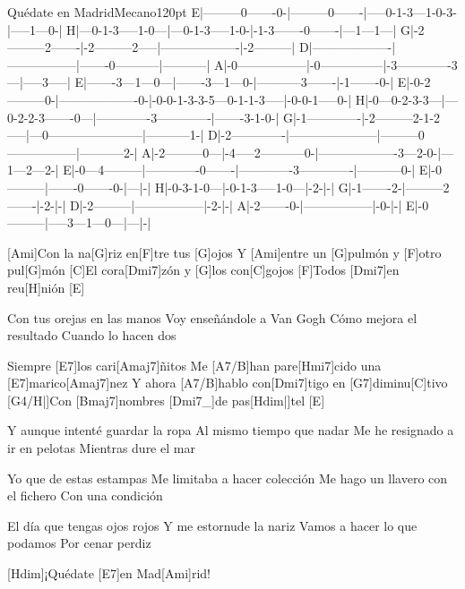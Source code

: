 \begin{song}{Quédate en Madrid}{Mecano}{120pt}
\tabs{20pt}
E|---------0-------0-|---------0-------|-----0-1-3---1-0-3-|-----1---0-|
H|---0-1-3-----1-0---|---0-1-3-----1-0-|-1-3-------0-------|---1---1---|
G|-2---------2-------|-2---------2-----|-------------------|-2---------|
D|-------------------|-----------------|-------0-----------|-----------|
A|-0-----------------|-0---------------|-3-------------3---|-----3-----|
E|-------3---1---0---|-------3---1---0-|-----------3-------|-1-------0-|
\endtabs
\tabs{-15pt}
E|-0-2---------0-|-------------------0-|-0-0-1-3-3-5---0-1-1-3-----|-0-0-1-----0-|
H|-0---0-2-3-3---|---0-2-2-3-------0---|-------------3-------------|-------3-1-0-|
G|-1-------------|-2---------2-1-2-----|---0-----------------------|-----------1-|
D|-2-------------|---------------------|---------0-----------------|-----------2-|
A|-2---------0---|-4-----2-----------0-|-------------------3---2-0-|---1---2---2-|
E|-0---4---------|-------------0-------|-------------3-------------|-----------0-|
\endtabs
\tabs{120pt}
E|-0---------|-------0-------0-|---|-|
H|-0-3-1-0---|-0-1-3-----1-0---|-2-|-|
G|-1-------2-|---------2-------|-2-|-|
D|-2---------|-----------------|-2-|-|
A|-2-------0-|-----------------|-0-|-|
E|-0---------|-----3---1---0---|---|-|
\endtabs

%
[Ami]Con la na[G]riz en[F]tre tus [G]ojos
Y [Ami]entre un [G]pulmón y [F]otro pul[G]món
[C]El cora[Dmi7]zón y [G]los con[C]gojos
[F]Todos [Dmi7]en reu[H]nión [E]{}

%
Con tus orejas en las manos
Voy enseñándole a Van Gogh
Cómo mejora el resultado
Cuando lo hacen dos

\chorus%
[Hmi7]Siempre [E7]los cari[Amaj7]{}ñitos
Me [A7/B]han pare[Hmi7]cido una [E7]marico[Amaj7]nez
Y ahora [A7/B]hablo con[Dmi7]tigo en [G7]diminu[C]tivo
[G4/H|]{}Con [Bmaj7]nombres [Dmi7_]{de pas}[Hdim|]{tel} [E]{}

%
Y aunque intenté guardar la ropa
Al mismo tiempo que nadar
Me he resignado a ir en pelotas
Mientras dure el mar

\chorus%
Yo que de estas estampas
Me limitaba a hacer colección
Me hago un llavero con el fichero
Con una condición

%
El día que tengas ojos rojos
Y me estornude la nariz
Vamos a hacer lo que podamos
Por cenar perdiz

[Hdim]{}¡Quédate [E7]en Mad[Ami]rid!
\end{song}

